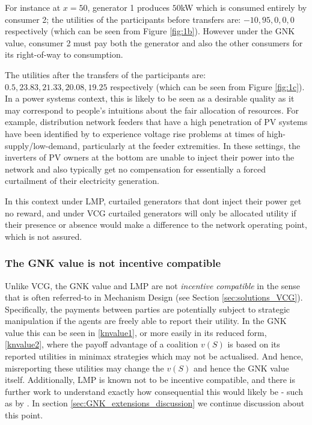 For instance at $x=50$, generator 1 produces $50$kW which is consumed entirely by consumer 2; the utilities of the participants before transfers are: $-10, 95, 0, 0, 0$ respectively (which can be seen from Figure \ref{fig:1b}).
However under the GNK value, consumer 2 must pay both the generator and also the other consumers for its right-of-way to consumption.

The utilities after the transfers of the participants are: $0.5, 23.83, 21.33, 20.08, 19.25$ respectively (which can be seen from Figure \ref{fig:1c}).
In a power systems context, this is likely to be seen as a desirable quality as it may correspond to people's intuitions about the fair allocation of resources.
For example, distribution network feeders that have a high penetration of PV systems have been identified by \cite{feeder1} to experience voltage rise problems at 
times of high-supply/low-demand, particularly at the feeder extremities. 
In these settings, the inverters of PV owners at the bottom are unable to inject their power into the network and also typically get no compensation for essentially a forced curtailment of their electricity generation.

In this context under LMP, curtailed generators that dont inject their power get no reward, and under VCG curtailed generators will only be allocated utility if their presence or absence would make a difference to the network operating point, which is not assured.

\subsubsection*{The GNK value is not incentive compatible}
Unlike VCG, the GNK value and LMP are not \emph{incentive compatible} in the sense that is often referred-to in Mechanism Design (see Section \ref{sec:solutions_VCG}).
Specifically, the payments between parties are potentially subject to strategic manipulation if the agents are freely able to report their utility.
In the GNK value this can be seen in \eqref{knvalue1}, or more easily in its reduced form, \eqref{knvalue2}, where the payoff advantage of a coalition $v(S)$ is based on its reported utilities in minimax strategies which may not be actualised.
And hence, misreporting these utilities may change the $v(S)$ and hence the GNK value itself.
Additionally, LMP is known not to be incentive compatible, and there is further work to understand exactly how consequential this would likely be - such as by \cite{8054716}.
In section \ref{sec:GNK_extensions_discussion} we continue discussion about this point.

